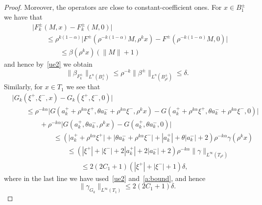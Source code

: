 \documentclass[letter,11pt]{amsart}
\theoremstyle{definition}
\numberwithin{equation}{section}
\begin{document}
\begin{proof}
\medskip

Moreover, the operators are close to constant-coefficient ones.
For $x \in B_1^{\pm}$ we have that
\[
\begin{split}
&\big|F_k^{\pm}(M, x) - F_k^{\pm}(M, 0)\big|\\
& \qquad \leq \rho^{k(1-\alpha)} \big|F^{\pm}(\rho^{-k(1-\alpha)}M, \rho^{k} x) - F^{\pm}(\rho^{-k(1-\alpha)}M, 0)\big|\\
& \qquad \qquad \leq \beta(\rho^k x) \left( \|M\| + 1\right)
\end{split}
\]
and hence by~\eqref{ue2} we obtain
\begin{equation}
\label{k5}
\|\beta_{F_k^{\pm}}\|_{L^n(B_1^{\pm})} \leq \rho^{-k}\|\beta^{\pm}\|_{L^n(B^{\pm}_{\rho^{k}})} \leq \delta.
\end{equation}
Similarly, for $x \in T_1$ we see that
\[\begin{split}
&\big|G_k(\xi^{+}, \xi^{-}, x) - G_k(\xi^{+}, \xi^{-}, 0) \big| \\
& \qquad \leq 
\rho^{-k \alpha}\big|G(a_k^{+} + \rho^{k \alpha} \xi^{+},\theta a_k^{-} + \rho^{k \alpha} \xi^{-}, \rho^{k} x) -G(a_k^{+} + \rho^{k\alpha} \xi^{+}, \theta a_k^{-} + \rho^{k\alpha} \xi^{-}, 0) \big|\\ 
& \qquad \qquad +\rho^{-k \alpha} \big|G(a_{k}^{+}, \theta a_{k}^{-}, \rho^{k} x) - G(a_{k}^{+}, \theta a_{k}^{-},0)\big|\\
& \qquad \qquad \qquad \leq 
\left( \big| a_{k}^{+} + \rho^{k\alpha} \xi^{+}\big| + \big| \theta a_{k}^{-} + \rho^{k\alpha} \xi^{-}\big| + |a_{k}^{+}| + \theta |a_{k}^{-}| + 2 \right) 
\rho^{-k \alpha} \gamma(\rho^{k} x)\\
& \qquad \qquad \qquad \qquad  \leq \left( |\xi^{+}| + |\xi^{-}| + 2 |a_k^{+}| + 2 |a_k^{-}| + 2\right) 
\rho^{-k \alpha} \|\gamma\|_{L^{\infty}(T_{\rho^{k}})}\\
& \qquad \qquad \qquad \qquad \qquad \leq 2(2 C_1 + 1) \left( |\xi^{+}| + |\xi^{-}| + 1\right) 
\delta,
\end{split}\]
where in the last line we have used~\eqref{ue2} and~\eqref{a:bound}, and hence
\begin{equation}
\label{k6}
\|\gamma_{G_k}\|_{L^{\infty}(T_1)} \leq 2(2 C_1 + 1) \delta.
\end{equation}

\medskip


\end{proof}
\end{document}
